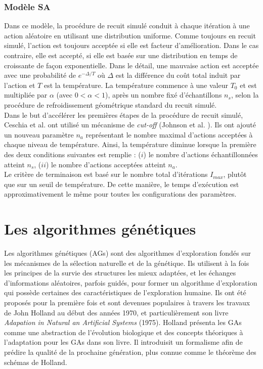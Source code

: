 \documentclass[12pt,a4paper]{article}
\begin{document}
		\subsubsection{Modèle SA}
		Dans ce modèle, la procédure de recuit simulé conduit à chaque itération à une action aléatoire en utilisant une distribution uniforme. Comme toujours en recuit simulé, l'action est toujours acceptée si elle est facteur d'amélioration. Dans le cas contraire, elle est accepté, si elle est basée sur une distribution en temps de croissante de façon exponentielle. Dans le détail, une mauvaise action est acceptée avec une probabilité de $e^{-\Delta/T}$ où $\Delta$ est la différence du coût total induit par l'action et $T$ est la température. La température commence à une valeur $T_{0}$ et est multipliée par $\alpha$ (avec $0 < \alpha < 1$), après un nombre fixé d'échantillons $n_{s}$, selon la procédure de refroidissement géométrique standard du recuit simulé. \\
		\hspace*{.5cm} Dans le but d'accélérer les premières étapes de la procédure de recuit simulé,  Ceschia et al. ont utilisé un mécanisme de \emph{cut-off} (Johnson et al. \cite{johnson}). Ils ont ajouté un nouveau paramètre $n_{a}$ représentant le nombre maximal d'actions acceptées à chaque niveau de température. Ainsi, la température diminue lorsque la première des deux conditions suivantes est remplie : ($i$) le nombre d'actions échantillonnées atteint $n_{s}$, ($ii$) le nombre d'actions acceptées atteint $n_{a}$. \\
		\hspace*{.5cm} Le critère de terminaison est basé sur le nombre total d'itérations $I_{max}$, plutôt que sur un seuil de température. De cette manière, le temps d'exécution est approximativement le même pour toutes les configurations des paramètres.
		
	\section{Les algorithmes génétiques}
		
	Les algorithmes génétiques (AGs) sont des algorithmes d’exploration fondés sur les mécanismes de la sélection naturelle et de la génétique. Ils utilisent à la fois les principes de la survie des structures les mieux adaptées, et les échanges d’informations aléatoires, parfois guidés, pour former un algorithme d’exploration qui possède certaines des caractéristiques de l’exploration humaine. Ils ont été proposés pour la première fois et sont devenues populaires à travers les travaux de John Holland au début des années 1970, et particulièrement son livre \emph{Adapation in Natural an Artificial Systems} (1975). Holland présenta les GAs comme une abstraction de l'évolution biologique et des concepts théoriques à l'adaptation pour les GAs dans son livre. Il introduisit un formalisme afin de prédire la qualité de la prochaine génération, plus connue comme le théorème des schémas de Holland.
	
\end{document}
